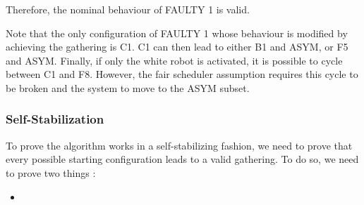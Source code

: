 \documentclass[11pt]{article}
\begin{document}
Therefore, the nominal behaviour of FAULTY 1 is valid.

Note that the only configuration of FAULTY 1 whose behaviour is modified by achieving the gathering is C1. C1 can then lead to either B1 and ASYM, or F5 and ASYM. Finally, if only the white robot is activated, it is possible to cycle between C1 and F8. However, the fair scheduler assumption requires this cycle to be broken and the system to move to the ASYM subset.



\subsubsection{Self-Stabilization}

To prove the algorithm works in a self-stabilizing fashion, we need to prove that every possible starting configuration leads to a valid gathering. To do so, we need to prove two things : 

\begin{itemize}
\item 
\end{itemize}
\end{document}
